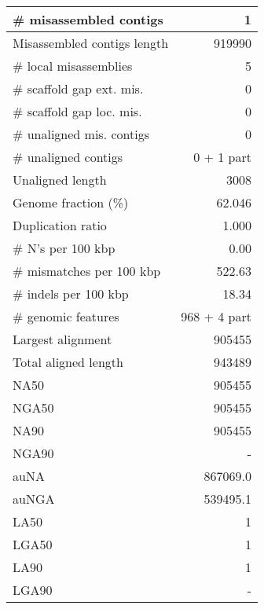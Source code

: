 \documentclass[12pt,a4paper]{article}
\begin{document}
\begin{table}[ht]
\begin{center}
\begin{tabular}{|l*{1}{|r}|}
\# misassembled contigs & 1 \\ \hline
Misassembled contigs length & 919990 \\ \hline
\# local misassemblies & 5 \\ \hline
\# scaffold gap ext. mis. & 0 \\ \hline
\# scaffold gap loc. mis. & 0 \\ \hline
\# unaligned mis. contigs & 0 \\ \hline
\# unaligned contigs & 0 + 1 part \\ \hline
Unaligned length & 3008 \\ \hline
Genome fraction (\%) & 62.046 \\ \hline
Duplication ratio & 1.000 \\ \hline
\# N's per 100 kbp & 0.00 \\ \hline
\# mismatches per 100 kbp & 522.63 \\ \hline
\# indels per 100 kbp & 18.34 \\ \hline
\# genomic features & 968 + 4 part \\ \hline
Largest alignment & 905455 \\ \hline
Total aligned length & 943489 \\ \hline
NA50 & 905455 \\ \hline
NGA50 & 905455 \\ \hline
NA90 & 905455 \\ \hline
NGA90 & - \\ \hline
auNA & 867069.0 \\ \hline
auNGA & 539495.1 \\ \hline
LA50 & 1 \\ \hline
LGA50 & 1 \\ \hline
LA90 & 1 \\ \hline
LGA90 & - \\ \hline
\end{tabular}
\end{center}
\end{table}
\end{document}
